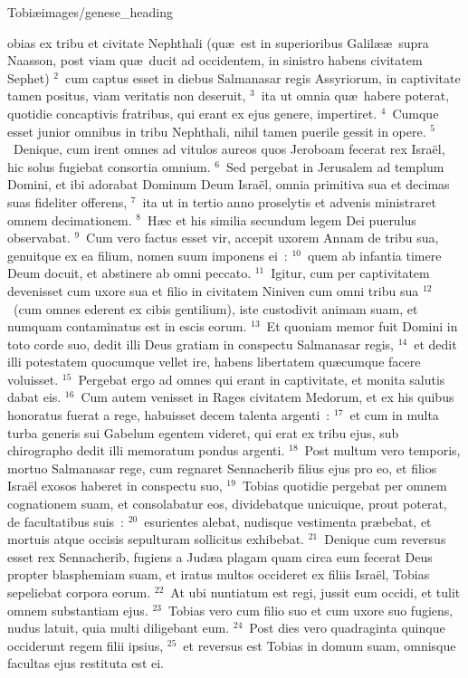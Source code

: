 {Tobiæ}{images/genese_heading}


\bchapter
{}obias ex tribu et civitate Nephthali (qu\ae\ est in superioribus Galil\ae \ae\ supra Naasson, post viam qu\ae\ ducit ad occidentem, in sinistro habens civitatem Sephet)
${}^{2}$~cum captus esset in diebus Salmanasar regis Assyriorum, in captivitate tamen positus, viam veritatis non deseruit,
${}^{3}$~ita ut omnia qu\ae\ habere poterat, quotidie concaptivis fratribus, qui erant ex ejus genere, impertiret.
${}^{4}$~Cumque esset junior omnibus in tribu Nephthali, nihil tamen puerile gessit in opere.
${}^{5}$~Denique, cum irent omnes ad vitulos aureos quos Jeroboam fecerat rex Isra\"el, hic solus fugiebat consortia omnium.
${}^{6}$~Sed pergebat in Jerusalem ad templum Domini, et ibi adorabat Dominum Deum Isra\"el, omnia primitiva sua et decimas suas fideliter offerens,
${}^{7}$~ita ut in tertio anno proselytis et advenis ministraret omnem decimationem.
${}^{8}$~H\ae c et his similia secundum legem Dei puerulus observabat.
${}^{9}$~Cum vero factus esset vir, accepit uxorem Annam de tribu sua, genuitque ex ea filium, nomen suum imponens ei~:
${}^{10}$~quem ab infantia timere Deum docuit, et abstinere ab omni peccato.
${}^{11}$~Igitur, cum per captivitatem devenisset cum uxore sua et filio in civitatem Niniven cum omni tribu sua
${}^{12}$~(cum omnes ederent ex cibis gentilium), iste custodivit animam suam, et numquam contaminatus est in escis eorum.
${}^{13}$~Et quoniam memor fuit Domini in toto corde suo, dedit illi Deus gratiam in conspectu Salmanasar regis,
${}^{14}$~et dedit illi potestatem quocumque vellet ire, habens libertatem qu\ae cumque facere voluisset.
${}^{15}$~Pergebat ergo ad omnes qui erant in captivitate, et monita salutis dabat eis.
${}^{16}$~Cum autem venisset in Rages civitatem Medorum, et ex his quibus honoratus fuerat a rege, habuisset decem talenta argenti~:
${}^{17}$~et cum in multa turba generis sui Gabelum egentem videret, qui erat ex tribu ejus, sub chirographo dedit illi memoratum pondus argenti.
${}^{18}$~Post multum vero temporis, mortuo Salmanasar rege, cum regnaret Sennacherib filius ejus pro eo, et filios Isra\"el exosos haberet in conspectu suo,
${}^{19}$~Tobias quotidie pergebat per omnem cognationem suam, et consolabatur eos, dividebatque unicuique, prout poterat, de facultatibus suis~:
${}^{20}$~esurientes alebat, nudisque vestimenta pr\ae bebat, et mortuis atque occisis sepulturam sollicitus exhibebat.
${}^{21}$~Denique cum reversus esset rex Sennacherib, fugiens a Jud\ae a plagam quam circa eum fecerat Deus propter blasphemiam suam, et iratus multos occideret ex filiis Isra\"el, Tobias sepeliebat corpora eorum.
${}^{22}$~At ubi nuntiatum est regi, jussit eum occidi, et tulit omnem substantiam ejus.
${}^{23}$~Tobias vero cum filio suo et cum uxore suo fugiens, nudus latuit, quia multi diligebant eum.
${}^{24}$~Post dies vero quadraginta quinque occiderunt regem filii ipsius,
${}^{25}$~et reversus est Tobias in domum suam, omnisque facultas ejus restituta est ei.

